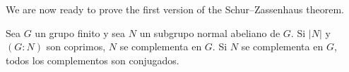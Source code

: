 	
	



We are now ready to prove the first version of the
Schur--Zassenhaus theorem. 

\begin{theorem}
	\label{theorem:SchurZassenhaus:abeliano}
	Sea $G$ un grupo finito y sea $N$ un subgrupo normal abeliano de $G$. Si
	$|N|$ y $(G:N)$ son coprimos, $N$ se complementa en $G$. Si $N$ se
	complementa en $G$, todos los complementos son conjugados.  
\end{theorem}

